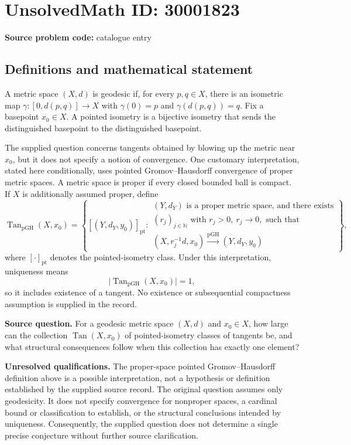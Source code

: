 \documentclass[11pt]{article}
\newcommand{\N}{\mathbb{N}}
\begin{document}
\section*{UnsolvedMath ID: 30001823}
\textbf{Source problem code:} catalogue entry
\subsection{Definitions and mathematical statement}
A metric space $(X,d)$ is geodesic if, for every $p,q\in X$, there is an isometric map $\gamma:[0,d(p,q)]\to X$ with $\gamma(0)=p$ and $\gamma(d(p,q))=q$. Fix a basepoint $x_0\in X$. A pointed isometry is a bijective isometry that sends the distinguished basepoint to the distinguished basepoint.

The supplied question concerns tangents obtained by blowing up the metric near $x_0$, but it does not specify a notion of convergence. One customary interpretation, stated here conditionally, uses pointed Gromov--Hausdorff convergence of proper metric spaces. A metric space is proper if every closed bounded ball is compact. If $X$ is additionally assumed proper, define
\[
\operatorname{Tan}_{\mathrm{pGH}}(X,x_0)
=
\left\{
[(Y,d_Y,y_0)]_{\mathrm{pt}}:
\begin{array}{l}
(Y,d_Y)\text{ is a proper metric space, and there exists}\\
(r_j)_{j\in\N}\text{ with }r_j>0,\ r_j\to0,\text{ such that}\\
(X,r_j^{-1}d,x_0)\xrightarrow{\mathrm{pGH}}(Y,d_Y,y_0)
\end{array}
\right\},
\]
where $[\cdot]_{\mathrm{pt}}$ denotes the pointed-isometry class. Under this interpretation, uniqueness means
\[
\bigl|\operatorname{Tan}_{\mathrm{pGH}}(X,x_0)\bigr|=1,
\]
so it includes existence of a tangent. No existence or subsequential compactness assumption is supplied in the record.

\textbf{Source question.} For a geodesic metric space $(X,d)$ and $x_0\in X$, how large can the collection $\operatorname{Tan}(X,x_0)$ of pointed-isometry classes of tangents be, and what structural consequences follow when this collection has exactly one element?

\textbf{Unresolved qualifications.} The proper-space pointed Gromov--Hausdorff definition above is a possible interpretation, not a hypothesis or definition established by the supplied source record. The original question assumes only geodesicity. It does not specify convergence for nonproper spaces, a cardinal bound or classification to establish, or the structural conclusions intended by uniqueness. Consequently, the supplied question does not determine a single precise conjecture without further source clarification.
\end{document}
